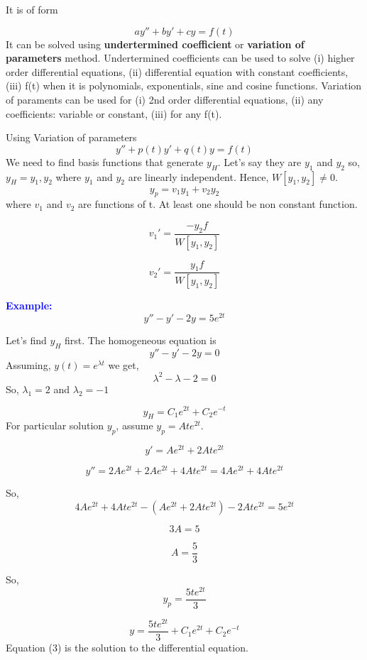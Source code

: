 \documentclass[
  11pt,
]{article}
\begin{document}
It is of form

\[
ay''+by'+cy=f(t)
\] It can be solved using \textbf{undertermined coefficient} or
\textbf{variation of parameters} method. Undertermined coefficients can
be used to solve (i) higher order differential equations, (ii)
differential equation with constant coefficients, (iii) f(t) when it is
polynomials, exponentials, sine and cosine functions. Variation of
paraments can be used for (i) 2nd order differential equations, (ii) any
coefficients: variable or constant, (iii) for any f(t).

Using Variation of parameters \[
y''+p(t)y'+q(t)y=f(t)
\] We need to find basis functions that generate \(y_H\). Let's say they
are \(y_1\) and \(y_2\) so, \(y_H={y_1, y_2}\) where \(y_1\) and \(y_2\)
are linearly independent. Hence, \(W[y_1, y_2] \neq 0\). \[
y_p = v_1y_1+v_2y_2
\] where \(v_1\) and \(v_2\) are functions of t. At least one should be
non constant function.

\[
v_1'=\frac{-y_2f}{W[y_1,y_2]}
\]

\[
v_2'=\frac{y_1f}{W[y_1,y_2]}
\]

\textbf{\textcolor{blue}{Example:}} \[
y''-y'-2y=5e^{2t}
\]

Let's find \(y_H\) first. The homogeneous equation is \[
y''-y'-2y=0
\] Assuming, \(y(t)=e^{\lambda t}\) we get, \[
\lambda^2-\lambda-2=0
\] So, \(\lambda _1 = 2\) and \(\lambda _2 = -1\)

\[
y_H = C_1e^{2t}+C_2e^{-t} \tag{1}
\] For particular solution \(y_p\), assume \(y_p = Ate^{2t}\).

\[
y'=Ae^{2t}+2Ate^{2t}
\]

\[
y''=2Ae^{2t}+2Ae^{2t}+4Ate^{2t} =4Ae^{2t}+4Ate^{2t}
\]

So, \[
4Ae^{2t}+4Ate^{2t}-(Ae^{2t}+2Ate^{2t})-2Ate^{2t}=5e^{2t}
\]

\[
3A=5
\]

\[
A=\frac{5}{3}
\]

So, \[
y_p = \frac{5te^{2t}}{3} \tag{2}
\]

\[
y = \frac{5te^{2t}}{3}+C_1e^{2t}+C_2e^{-t} \tag{3}
\] Equation (3) is the solution to the differential equation.
\end{document}

